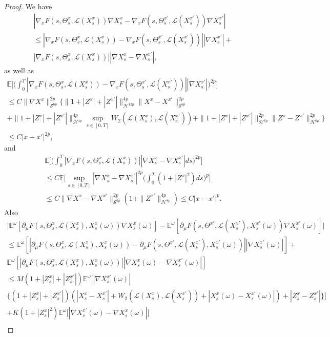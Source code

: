 \documentclass[10pt,a4paper]{amsart}
\newcommand{\E}{\mathbb E}
\newcommand{\Te}{\Theta}
\newcommand{\cH}{\mathcal H}
\newcommand{\cL}{\mathcal L}
\newcommand{\cS}{\mathcal S}
\newcommand{\om}{\omega}
\begin{document}
\begin{proof}
  We have
  \begin{multline*}
 |\nabla_xF(s,\Te^x_s,\cL(X^x_s))\nabla X^x_s-\nabla_xF(s,\Te_s ^{x'},\cL(X^{x'}_s))\nabla X^{x'}_s|\\\le
|\nabla_xF(s,\Te^x_s,\cL(X^x_s))-\nabla_xF(s,\Te_s ^{x'},\cL(X^{x'}_s))||\nabla X^{x'}_s|+\\
|\nabla_xF(s,\Te^x_s,\cL(X^x_s))||\nabla X^x_s-\nabla X^{x'}_s|,
\end{multline*}
as well as
\begin{multline*}
 \E\Big[\Big(\int_0^T|\nabla_xF(s,\Te^x_s,\cL(X^x_s))
    -\nabla_xF(s,\Te_s ^{x'},\cL(X^{x'}_s))||\nabla
    X^{x'}_s|\Big)^{2p}\Big]\\\le C
\|\nabla
X^x\|_{\cS^{6p}}^{2p}\{\|1+|Z^x|+|Z^{x'}|\|_{\cH^{12p}}^{4p}\|X^x-X^{x'}\|_{\cS^{6p}}^{2p}\\+\|1+|Z^x|+|Z^{x'}|\|_{\cH^{4p}}^{4p}\sup_{s\in[0,T]}W_2(\cL(X^x_s), \cL(X^{x'}_s))
+\|1+|Z^x|+|Z^{x'}|\|_{\cH^{6p}}^{2p}\|Z^x-Z^{x'}\|_{\cH^{6p}}^{2p}\}\\\le C|x-x'|^{2p},
  \end{multline*}
and
  \begin{multline*}
    \E\Big[\Big(\int_0^T |\nabla_xF(s,\Te^x_s,\cL(X^x_s))||\nabla
    X^x_s-\nabla X^{x'}_s|ds\Big)^{2p}\Big]\\\le C
\E\Big[\sup_{s\in[0,T]}|\nabla X^x_s-\nabla X^{x'}_s|^{2p}
\Big(\int_0^T(1+|Z^x|^2)ds\Big)^p\Big]\\\le C
\|\nabla X^x-\nabla X^{x'}\|_{\cS^{6p}}^{2p}(1+\|Z^{x'}\|_{\cH^{8p}}^{4p})
\le C|x-x'|^p.
\end{multline*}
Also
\begin{multline*}
\big|\E^\om[\partial_\mu F(s,\Te^x_s,\cL(X^x_s), X^x_s(\om))\nabla X^x_s(\om)]
 -\E^\om[\partial_\mu F(s,\Te^{x'},\cL(X^{x'}_s), X^{x'}_s(\om))\nabla X^{x'}_s(\om)]\big|\\\le
  \E^\om[|\partial_\mu F(s,\Te^x_s,\cL(X^x_s), X^x_s(\om))
  -\partial_\mu F(s,\Te^{x'},\cL(X^{x'}_s), X^{x'}_s(\om))||\nabla X^{x'}_s(\om)|]
+\\ \E^\om[|\partial_\mu F(s,\Te^x_s,\cL(X^x_s), X^x_s(\om))||\nabla X^x_s(\om)-\nabla X^{x'}_s(\om)|]\\\le
M (1+|Z^x_s|+|Z^{x'}_s|)\E^\om\big[|\nabla X^{x'}_s(\om)|\\
  \{(1+|Z^x_s|+|Z^{x'}_s|)(|X^x_s-X^{x'}_s|+W_2(\cL(X^x_s),\cL(X^{x'}_s))
  +|X^x_s(\om)-X^{x'}_s(\om)|)+|Z^x_s-Z^{x'}_s|\}\big]\\
  +K (1+|Z^x_s|^2)\E^\om\big[|\nabla X^{x'}_s(\om)-\nabla X^x_s(\om)|\big]\\

\end{multline*}
\end{proof}
\end{document}
